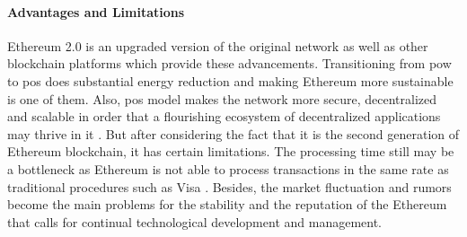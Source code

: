\paragraph{Advantages and Limitations}

Ethereum 2.0 is an upgraded version of the original network as well as other blockchain platforms which provide these advancements. Transitioning from \gls{pow} to 
\gls{pos} does substantial energy reduction and making Ethereum more sustainable is one of them. Also, \gls{pos} model makes the network more secure, decentralized and 
scalable in order that a flourishing ecosystem of decentralized applications may thrive in it \cite{ethereumpos}. But after considering the fact that it is the second generation 
of Ethereum blockchain, it has certain limitations. The processing time still may be a bottleneck as Ethereum is not able to process transactions in the same 
rate as traditional procedures such as Visa \cite{9129332}. Besides, the market fluctuation and rumors become the main problems for the stability and the reputation of the 
Ethereum that calls for continual technological development and management.